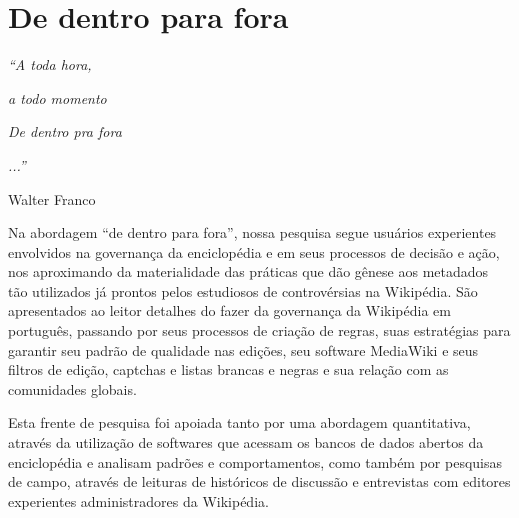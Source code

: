 \chapter{De dentro para fora}

\singlespacing
\begin{flushright}
\textit{``A toda hora,}

\textit{a todo momento}

\textit{De dentro pra fora}

\textit{...''}

Walter Franco
\end{flushright}
\doublespacing

Na abordagem ``de dentro para fora'', nossa pesquisa segue usuários experientes envolvidos na governança da enciclopédia e em seus processos de decisão e ação, nos aproximando da materialidade das práticas que dão gênese aos metadados tão utilizados já prontos pelos estudiosos de controvérsias na Wikipédia. São apresentados ao leitor detalhes do fazer da governança da Wikipédia em português, passando por seus processos de criação de regras, suas estratégias para garantir seu padrão de qualidade nas edições, seu software MediaWiki e seus filtros de edição, captchas e listas brancas e negras e sua relação com as comunidades globais.

Esta frente de pesquisa foi apoiada tanto por uma abordagem quantitativa, através da utilização de softwares que acessam os bancos de dados abertos da enciclopédia e analisam padrões e comportamentos, como também por pesquisas de campo, através de leituras de históricos de discussão e entrevistas com editores experientes administradores da Wikipédia.





